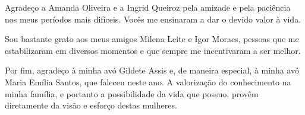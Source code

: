   Agradeço a Amanda Oliveira e a Ingrid Queiroz pela amizade e pela paciência nos meus períodos mais difíceis. Vocês me ensinaram a dar o devido valor à vida.

  Sou bastante grato aos meus amigos Milena Leite e Igor Moraes, pessoas que me estabilizaram em diversos momentos e que sempre me incentivaram a ser melhor.

  Por fim, agradeço à minha avó Gildete Assis e, de maneira especial, à minha avó Maria Emília Santos, que faleceu neste ano. A valorização do conhecimento na minha família, e portanto a possibilidade da vida que possuo, provêm diretamente da visão e esforço destas mulheres.
